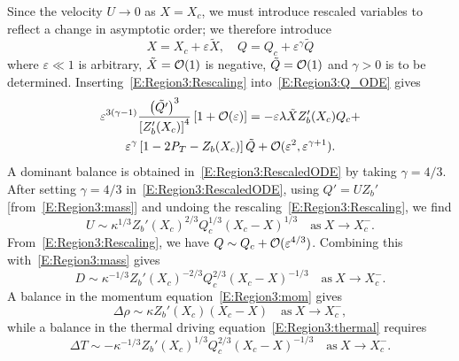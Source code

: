 \documentclass{article}
\begin{document}
Since the velocity $U \to 0$ as $X = X_c$, we must introduce rescaled variables to reflect a change in asymptotic order; we therefore introduce
\begin{equation}\label{E:Region3:Rescaling}
X = X_c + \varepsilon \tilde{X}, \quad Q = Q_c + \varepsilon^\gamma \tilde{Q}
\end{equation}
where $\varepsilon \ll 1$ is arbitrary, $\tilde{X} =\mathcal{O}(1)$ is negative, $\tilde{Q} = \mathcal{O}(1)$ and $\gamma >0$ is to be determined. Inserting~\eqref{E:Region3:Rescaling} into~\eqref{E:Region3:Q_ODE} gives
\begin{multline}\label{E:Region3:RescaledODE}
\varepsilon^{3(\gamma - 1)}\frac{\left(\tilde{Q'}\right)^3}{\left[Z_b'(X_c)\right]^4}\left[1 + \mathcal{O}(\varepsilon) \right]= -\varepsilon\lambda\tilde{X}Z_b'(X_c)Q_c + \\ \varepsilon^\gamma \left[1 - 2\textit{P}_T - Z_b(X_c)\right] \tilde{Q} + \mathcal{O}(\varepsilon^2, \varepsilon^{\gamma + 1}).
\end{multline}
A dominant balance is obtained in~\eqref{E:Region3:RescaledODE} by taking $\gamma = 4/3$. After setting $\gamma = 4/3$ in~\eqref{E:Region3:RescaledODE}, using $Q' = U Z_b'$ [from~\eqref{E:Region3:mass}] and undoing the rescaling~\eqref{E:Region3:Rescaling}, we find 
\begin{equation}\label{E:Region3:U_asym}
U \sim \kappa^{1/3} Z_b'(X_c)^{2/3} Q_c^{1/3}(X_c - X)^{1/3} \quad \text{as}~X \to X_c^-.
\end{equation}
From~\eqref{E:Region3:Rescaling}, we have $Q \sim Q_c + \mathcal{O}(\varepsilon^{4/3})$. Combining this with~\eqref{E:Region3:mass} gives
\begin{equation}\label{E:Region3:D_asym}
D \sim \kappa^{-1/3} Z_b'(X_c)^{-2/3} Q_c^{2/3}(X_c - X)^{-1/3} \quad \text{as}~X \to X_c^-.
\end{equation}
A balance in the momentum equation~\eqref{E:Region3:mom} gives
\begin{equation}\label{E:Region3:drho_asym}
\Delta \rho \sim  \kappa Z_b'(X_c) (X_c - X)\quad \text{as}~X \to X_c^-,
\end{equation}
while a balance in the thermal driving equation~\eqref{E:Region3:thermal} requires
\begin{equation}\label{E:Region3:dT_asym}
 \Delta T \sim -\kappa^{-1/3} Z_b'(X_c)^{1/3} Q_c^{2/3}(X_c - X)^{-1/3} \quad \text{as}~X \to X_c^-.
 \end{equation}
\end{document}
